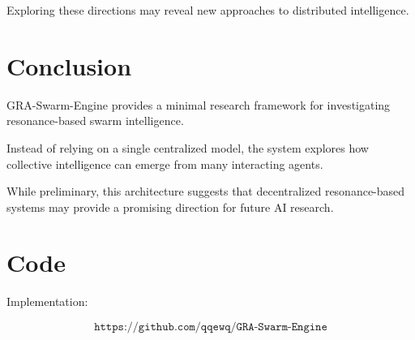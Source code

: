 \documentclass[11pt]{article}
\begin{document}
Exploring these directions may reveal new approaches to distributed intelligence.

\section{Conclusion}

GRA-Swarm-Engine provides a minimal research framework for investigating resonance-based swarm intelligence.

Instead of relying on a single centralized model, the system explores how collective intelligence can emerge from many interacting agents.

While preliminary, this architecture suggests that decentralized resonance-based systems may provide a promising direction for future AI research.

\section*{Code}

Implementation:

\[
\texttt{https://github.com/qqewq/GRA-Swarm-Engine}
\]
\end{document}
